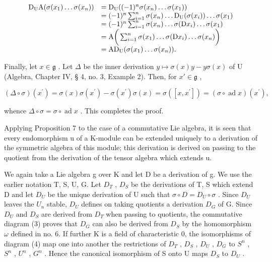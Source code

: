\[
\begin{array}{r l} \mathrm{D} _ {\mathrm{U}} \mathrm{A} (\sigma (x _ {1}) \dots \sigma (x _ {n})) & = \mathrm{D} _ {\mathrm{U}} ((- 1) ^ {n} \sigma (x _ {n}) \dots \sigma (x _ {1})) \\ & = (- 1) ^ {n} \sum_ {i = 1} ^ {n} \sigma (x _ {n}) \dots \mathrm{D} _ {\mathrm{U}} (\sigma (x _ {i})) \dots \sigma (x _ {1}) \\ & = (- 1) ^ {n} \sum_ {i = 1} ^ {n} \sigma (x _ {n}) \dots \sigma (\mathrm{D} x _ {i}) \dots \sigma (x _ {1}) \\ & = \mathrm{A} \bigg (\sum_ {i = 1} ^ {n} \sigma (x _ {1}) \dots \sigma (\mathrm{D} x _ {i}) \dots \sigma (x _ {n}) \bigg) \\ & = \mathrm{AD} _ {\mathrm{U}} (\sigma (x _ {1}) \dots \sigma (x _ {n})). \end{array}
\]

Finally, let \(x \in \mathfrak{g}\) . Let \(\Delta\) be the inner derivation \(y \mapsto \sigma(x)y - y\sigma(x)\) of U (Algebra, Chapter IV, § 4, no. 3, Example 2). Then, for \(x' \in \mathfrak{g}\) ,

\[
(\Delta \circ \sigma) (x ^ {\prime}) = \sigma (x) \sigma (x ^ {\prime}) - \sigma (x ^ {\prime}) \sigma (x) = \sigma ([ x, x ^ {\prime} ]) = (\sigma \circ \operatorname{ad} x) (x ^ {\prime}),
\]

whence \(\Delta \circ \sigma = \sigma \circ \operatorname{ad} x\) . This completes the proof.

Applying Proposition 7 to the case of a commutative Lie algebra, it is seen that every endomorphism u of a K-module can be extended uniquely to a derivation of the symmetric algebra of this module; this derivation is derived on passing to the quotient from the derivation of the tensor algebra which extends u.

We again take a Lie algebra g over K and let D be a derivation of g. We use the earlier notation T, S, U, G. Let \(D_{T}\) , \(D_{S}\) be the derivations of T, S which extend D and let \(D_{U}\) be the unique derivation of U such that \(\sigma \circ D = D_{U} \circ \sigma\) . Since \(D_{U}\) leaves the \(U_{n}\) stable, \(D_{U}\) defines on taking quotients a derivation \(D_{G}\) of G. Since \(D_{U}\) and \(D_{S}\) are derived from \(D_{T}\) when passing to quotients, the commutative diagram (3) proves that \(D_{G}\) can also be derived from \(D_{S}\) by the homomorphism \(\omega\) defined in no. 6. If further K is a field of characteristic 0, the isomorphisms of diagram (4) map one into another the restrictions of \(D_{T}\) , \(D_{S}\) , \(D_{U}\) , \(D_{G}\) to \(S^{n}\) , \(S^{n}\) , \(U^{n}\) , \(G^{n}\) . Hence the canonical isomorphism of S onto U maps \(D_{S}\) to \(D_{U}\) .

